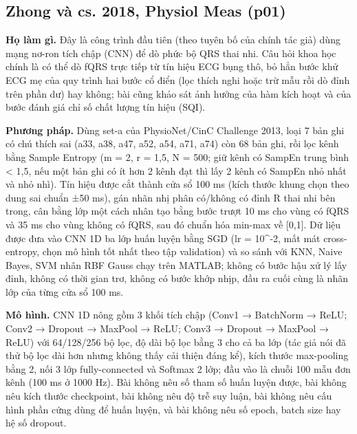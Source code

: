 \documentclass[12pt,a4paper]{article}
\begin{document}
\subsection{Zhong và cs. 2018, Physiol Meas \normalfont\small (p01)}
\par\vspace{2pt}
\par\vspace{4pt}
\noindent \textbf{Họ làm gì.} Đây là công trình đầu tiên (theo tuyên bố của chính tác giả) dùng mạng nơ-ron tích chập (CNN) để dò phức bộ QRS thai nhi. Câu hỏi khoa học chính là có thể dò fQRS trực tiếp từ tín hiệu ECG bụng thô, bỏ hẳn bước khử ECG mẹ của quy trình hai bước cổ điển (lọc thích nghi hoặc trừ mẫu rồi dò đỉnh trên phần dư) hay không; bài cũng khảo sát ảnh hưởng của hàm kích hoạt và của bước đánh giá chỉ số chất lượng tín hiệu (SQI).\par\vspace{3pt}
\noindent \textbf{Phương pháp.} Dùng set-a của PhysioNet/CinC Challenge 2013, loại 7 bản ghi có chú thích sai (a33, a38, a47, a52, a54, a71, a74) còn 68 bản ghi, rồi lọc kênh bằng Sample Entropy (m = 2, r = 1,5, N = 500; giữ kênh có SampEn trung bình < 1,5, nếu một bản ghi có ít hơn 2 kênh đạt thì lấy 2 kênh có SampEn nhỏ nhất và nhỏ nhì). Tín hiệu được cắt thành cửa sổ 100 ms (kích thước khung chọn theo dung sai chuẩn ±50 ms), gán nhãn nhị phân có/không có đỉnh R thai nhi bên trong, cân bằng lớp một cách nhân tạo bằng bước trượt 10 ms cho vùng có fQRS và 35 ms cho vùng không có fQRS, sau đó chuẩn hóa min-max về [0,1]. Dữ liệu được đưa vào CNN 1D ba lớp huấn luyện bằng SGD (lr = 10\textasciicircum{}-2, mất mát cross-entropy, chọn mô hình tốt nhất theo tập validation) và so sánh với KNN, Naive Bayes, SVM nhân RBF Gauss chạy trên MATLAB; không có bước hậu xử lý lấy đỉnh, không có thời gian trơ, không có bước khớp nhịp, đầu ra cuối cùng là nhãn lớp của từng cửa sổ 100 ms.\par\vspace{3pt}
\noindent \textbf{Mô hình.} CNN 1D nông gồm 3 khối tích chập (Conv1 → BatchNorm → ReLU; Conv2 → Dropout → MaxPool → ReLU; Conv3 → Dropout → MaxPool → ReLU) với 64/128/256 bộ lọc, độ dài bộ lọc bằng 3 cho cả ba lớp (tác giả nói đã thử bộ lọc dài hơn nhưng không thấy cải thiện đáng kể), kích thước max-pooling bằng 2, nối 3 lớp fully-connected và Softmax 2 lớp; đầu vào là chuỗi 100 mẫu đơn kênh (100 ms ở 1000 Hz). Bài không nêu số tham số huấn luyện được, bài không nêu kích thước checkpoint, bài không nêu độ trễ suy luận, bài không nêu cấu hình phần cứng dùng để huấn luyện, và bài không nêu số epoch, batch size hay hệ số dropout.\par\vspace{3pt}
\end{document}
